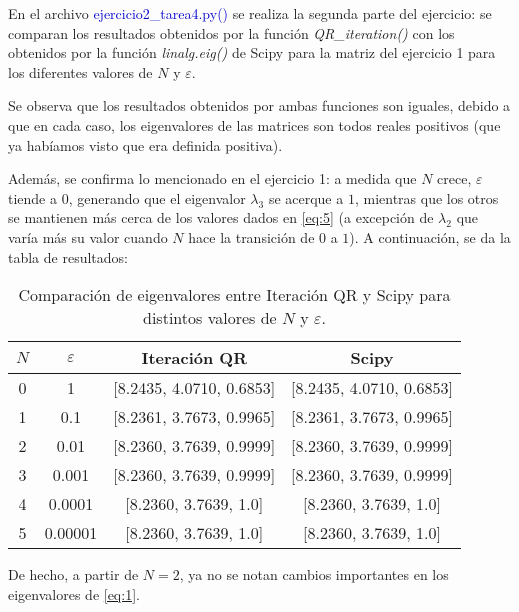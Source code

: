 En el archivo \textcolor{mediumblue}{ejercicio2\_tarea4.py()} se realiza la segunda parte del ejercicio: se comparan los resultados obtenidos por la función \textit{QR\_iteration()} con los
obtenidos por la función \textit{linalg.eig()} de Scipy para la matriz del ejercicio 1 para los diferentes valores de $N$ y $\varepsilon$.

Se observa que los resultados obtenidos por ambas funciones son iguales, debido a que en cada caso, los eigenvalores de las matrices son todos reales positivos (que ya habíamos visto que era definida positiva).

Además, se confirma lo mencionado en el ejercicio 1: a medida que $N$ crece, $\varepsilon$ tiende a $0$, generando que el eigenvalor $\lambda_3$ se acerque a $1$, mientras que los otros se mantienen más cerca de los valores dados en \eqref{eq:5} (a excepción de $\lambda_2$ que varía más su valor cuando $N$ hace la transición de $0$ a $1$). A continuación, se da la tabla de resultados:

\begin{table}[ht]
	\centering
	\begin{tabular}{|c|c|c|c|}
		\hline
		$N$ & $\varepsilon$ & \textbf{Iteración QR} & \textbf{Scipy} \\ \hline
		0 & 1      & [8.2435, 4.0710, 0.6853] & [8.2435, 4.0710, 0.6853] \\ \hline
		1 & 0.1    & [8.2361, 3.7673, 0.9965] & [8.2361, 3.7673, 0.9965] \\ \hline
		2 & 0.01   & [8.2360, 3.7639, 0.9999]   & [8.2360, 3.7639, 0.9999] \\ \hline
		3 & 0.001  & [8.2360, 3.7639, 0.9999] & [8.2360, 3.7639, 0.9999] \\ \hline
		4 & 0.0001 & [8.2360, 3.7639, 1.0]        & [8.2360, 3.7639, 1.0] \\ \hline
		5 & 0.00001  & [8.2360, 3.7639, 1.0]     & [8.2360, 3.7639, 1.0] \\ \hline
	\end{tabular}
	\caption{Comparación de eigenvalores entre Iteración QR y Scipy para distintos valores de $N$ y $\varepsilon$.}
\end{table}

De hecho, a partir de $N=2$, ya no se notan cambios importantes en los eigenvalores de \eqref{eq:1}.







